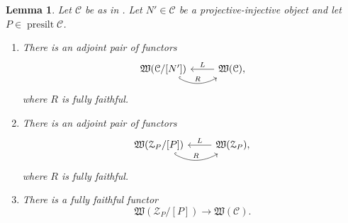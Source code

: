 \documentclass[10pt,twoside, a4paper,reqno]{amsart}
\DeclareMathOperator{\presilt}{presilt}
\newcommand{\Wfrak}{\mathfrak{W}}
\newcommand{\calC}{\mathcal{C}}
\newcommand{\calZ}{\mathcal{Z}}
\newtheorem{lemma}[theorem]{Lemma}
\theoremstyle{definition}
\begin{document}
\begin{lemma}\label{lem:redadj}
	Let $\calC$ be as in . Let $N' \in \calC$ be a projective-injective object and let $P \in \presilt \calC$.
	\begin{enumerate}
		\item\label{lem:redadj1} There is an adjoint pair of functors
		\begin{equation*}
    		\begin{tikzcd}
       		 \Wfrak(\calC/[N'])\arrow[r,hook,bend right, "R"] & \Wfrak(\calC)\arrow[l, "L",swap],
   		 \end{tikzcd}
   		 \end{equation*} 
		 where $R$ is fully faithful.
		\item\label{lem:redadj2} There is an adjoint pair of functors
		\begin{equation*}
    		\begin{tikzcd}
       		 \Wfrak(\calZ_P/[P])\arrow[r,hook,bend right, "R"] & \Wfrak(\calZ_P)\arrow[l, "L",swap],
   		 \end{tikzcd}
   		 \end{equation*} 
		 where $R$ is fully faithful.
		 \item\label{lem:redadj3} There is a fully faithful functor
		 \[ \Wfrak(\calZ_P/[P]) \to \Wfrak(\calC). \]
	\end{enumerate}
\end{lemma}
\end{document}
